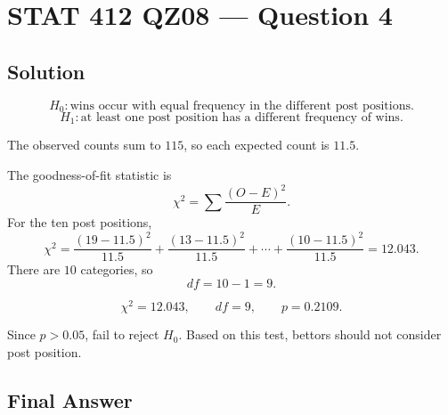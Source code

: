 \documentclass[11pt]{article}
\begin{document}
\section*{STAT 412 QZ08 --- Question 4}

\subsection*{Solution}

\[
H_0:\text{wins occur with equal frequency in the different post positions.}
\]
\[
H_1:\text{at least one post position has a different frequency of wins.}
\]

The observed counts sum to \(115\), so each expected count is \(11.5\).

The goodness-of-fit statistic is
\[
\chi^2=\sum\frac{(O-E)^2}{E}.
\]
For the ten post positions,
\[
\chi^2=
\frac{(19-11.5)^2}{11.5}
+\frac{(13-11.5)^2}{11.5}
+\cdots
+\frac{(10-11.5)^2}{11.5}
=12.043.
\]
There are \(10\) categories, so
\[
df=10-1=9.
\]

\[
\chi^2=12.043,\qquad df=9,\qquad p=0.2109.
\]

Since \(p>0.05\), fail to reject \(H_0\). Based on this test, bettors should not consider post position.

\subsection*{Final Answer}

\end{document}
